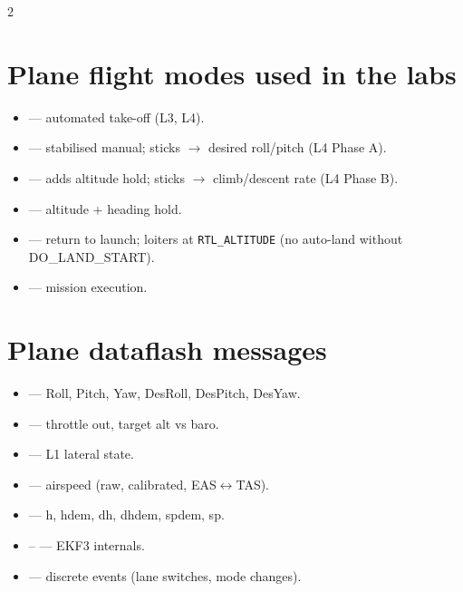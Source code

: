 \begin{multicols}{2}
\section*{Plane flight modes used in the labs}
\begin{itemize}\footnotesize
  \item {} --- automated take-off (L3, L4).
  \item {} --- stabilised manual; sticks $\rightarrow$ desired roll/pitch (L4 Phase A).
  \item {} --- adds altitude hold; sticks $\rightarrow$ climb/descent rate (L4 Phase B).
  \item {} --- altitude + heading hold.
  \item {} --- return to launch; loiters at \texttt{RTL\_ALTITUDE} (no auto-land without DO\_LAND\_START).
  \item {} --- mission execution.
\end{itemize}

\section*{Plane dataflash messages}
\begin{itemize}\footnotesize
  \item {} --- Roll, Pitch, Yaw, DesRoll, DesPitch, DesYaw.
  \item {} --- throttle out, target alt vs baro.
  \item {} --- L1 lateral state.
  \item {} --- airspeed (raw, calibrated, EAS$\leftrightarrow$TAS).
  \item {} --- h, hdem, dh, dhdem, spdem, sp.
  \item {}-- --- EKF3 internals.
  \item {} --- discrete events (lane switches, mode changes).
\end{itemize}


\end{multicols}
